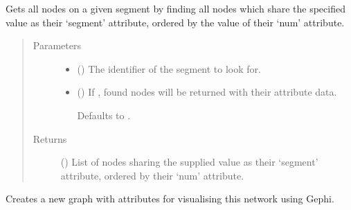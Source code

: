 \documentclass[letterpaper,10pt,english]{sphinxmanual}
\begin{document}
\begin{fulllineitems}
\begin{fulllineitems}
\label{\detokenize{cockatoo:cockatoo.KnitNetworkBase.nodes_on_segment}}
Gets all nodes on a given segment by finding all nodes which share the
specified value as their ‘segment’ attribute, ordered by the value of
their ‘num’ attribute.
\begin{quote}\begin{description}
\item[{Parameters}] \leavevmode\begin{itemize}
\item {} 
 () \textendash{} The identifier of the segment to look for.

\item {} 
 (\sphinxstyleliteralemphasis{\sphinxupquote{, }}) \textendash{} 
If , found nodes will be returned with their attribute
data.

Defaults to .


\end{itemize}

\item[{Returns}] \leavevmode
{} () \textendash{} List of nodes sharing the supplied value as their ‘segment’
attribute, ordered by their ‘num’ attribute.

\end{description}\end{quote}

\end{fulllineitems}


\begin{fulllineitems}
\label{\detokenize{cockatoo:cockatoo.KnitNetworkBase.prepare_for_gephi}}
Creates a new graph with attributes for visualising this network
using Gephi.


\end{fulllineitems}
\end{fulllineitems}
\end{document}
